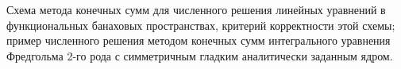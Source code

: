 \documentclass[__main__.tex]{subfiles}
\begin{document}
Схема метода конечных сумм для численного решения линейных уравнений в функциональных банаховых пространствах, критерий корректности этой схемы; пример численного решения методом конечных сумм интегрального уравнения Фредгольма 2-го рода с симметричным гладким аналитически заданным ядром.
\end{document}
